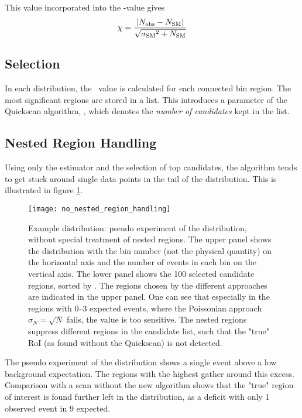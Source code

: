 This value incorporated into the \mychi-value gives
\begin{equation}
\chi = \frac{|{N_\mathrm{obs}} - {N_\mathrm{SM}}|}{\sqrt{{\sigma_\mathrm{SM}}^2 + {N_\mathrm{SM}}}}
\end{equation}

\subsection{Selection}
In each distribution, the \mychi~value is calculated for each connected bin region. The most significant regions are stored in a list. This introduces a parameter of the Quickscan algorithm, \paramregions, which denotes the \emph{number of candidates} kept in the list.

\subsection{Nested Region Handling}
Using only the estimator and the selection of top \paramregions candidates, the algorithm tends to get stuck around single data points in the tail of the distribution. This is illustrated in figure \ref{fig:no_nested_region_handling}. 
\begin{figure}[htb]
	\centering
	\texttt{[image: no\_nested\_region\_handling]}
	\caption{Example distribution: pseudo experiment of the  \sumpT distribution, without special treatment of nested regions. The upper panel shows the distribution with the bin number (not the physical quantity) on the horizontal axis and the number of events in each bin on the vertical axis. The lower panel shows the \num{100} selected candidate regions, sorted by \mychi. The regions chosen by the different approaches are indicated in the upper panel. One can see that especially in the regions with \numrange{0}{3} expected events, where the Poissonian approach $\sigma_N = \sqrt{N}$ fails, the \mychi value is too sensitive. The nested regions suppress different regions in the candidate list, such that the "true" RoI (as found without the Quickscan) is not detected.}
	\label{fig:no_nested_region_handling}
\end{figure}
The pseudo experiment of the  \sumpT distribution shows a single event above a low background expectation. The regions with the highest \mychi gather around this excess. Comparison with a scan without the new algorithm shows that the "true" region of interest is found further left in the distribution, as a deficit with only \num{1} observed event in \num{9} expected.

